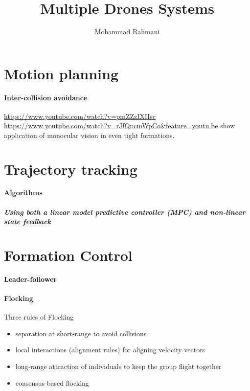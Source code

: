 \documentclass{article}
\begin{document}
	
	\title{Multiple Drones Systems}
	\author{Mohammad Rahmani}
	\date{}
	\maketitle
	\section{Motion planning}
		\paragraph{Inter-collision avoidance}
			\cite{baca-2018-model-predictive-trajectory-tracking-and-collision-avoidance-for-reliable-outdoor-deployment-of-unmanned-aerial-vehicles}
			\url{https://www.youtube.com/watch?v=pmZZzIXIIsc}
			\url{https://www.youtube.com/watch?v=rJfQncmWpCo\&feature=youtu.be} show application of monocular vision in even tight formations.
	\section{Trajectory tracking}
		\cite{baca-2018-model-predictive-trajectory-tracking-and-collision-avoidance-for-reliable-outdoor-deployment-of-unmanned-aerial-vehicles}
		\paragraph{Algorithms}
			\subparagraph{Using both a linear model predictive controller (MPC) and non-linear state feedback}
			\cite{baca-2018-model-predictive-trajectory-tracking-and-collision-avoidance-for-reliable-outdoor-deployment-of-unmanned-aerial-vehicles}
	\section{Formation Control}
		\cite{mora-2018-distributed-multi-robot-formation-control-in-dynamic-environments}
		\cite{mora-2017-multi-robot-formation-control-and-object-transport-in-dynamic-environments-via-constrained-optimization}
		\paragraph{Leader-follower}
		\paragraph{Flocking}
			Three rules of Flocking \citep{reynolds-1987-flocks-herds-and-schools-a-distributed-behavioral-model}
			\begin{itemize}
				\item separation at short-range to avoid collisions
				\item local interactions (alignment rules) for aligning velocity vectors 
				\item long-range attraction of individuals to keep the group flight together
			\end{itemize}
			\begin{itemize}
				\item  consensus-based flocking
			\end{itemize}
\end{document}
